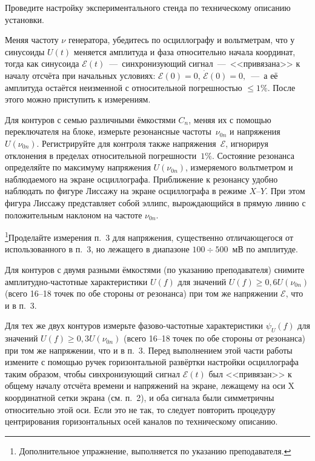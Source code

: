 \begin{lab:task}
    \item Проведите настройку экспериментального стенда по техническому описанию
установки.

    \item Меняя частоту $\nu$ генератора, убедитесь по осциллографу и вольтметрам,
что у синусоиды $U(t)$ меняется амплитуда и фаза относительно начала координат,
тогда как синусоида $\mathcal{E}(t)$~---~синхронизующий сигнал~---~<<привязана>>
к началу отсчёта при начальных условиях: $\mathcal{E}(0)=0$,
$\dot{\mathcal{E}}(0)=0,$~---~а её амплитуда остаётся неизменной с относительной
погрешностью  $\le1\%$. После этого можно приступить к измерениям.

    \item Для контуров с семью различными ёмкостями $C_n$, меняя их с помощью
переключателя на блоке, измерьте резонансные частоты~$\nu_{0n}$ и напряжения
$U(\nu_{0n})$. Регистрируйте для контроля также напряжения~$\mathcal{E}$,
игнорируя отклонения в пределах относительной погрешности~$1\%$. Состояние
резонанса определяйте по максимуму напряжения $U(\nu_{0n})$, измеряемого
вольтметром и наблюдаемого на экране осциллографа. Приближение к резонансу
удобно наблюдать по фигуре Лиссажу на экране осциллографа в режиме $X$--$Y$.
При этом фигура Лиссажу представляет собой эллипс, вырождающийся в прямую линию
с положительным наклоном  на частоте $\nu_{0n}$.

    \item \footnote{Дополнительное упражнение, выполняется по указанию
        преподавателя.}Проделайте измерения п.~3 для напряжения, существенно 
    отличающегося от использованного в п.~3, но лежащего в диапазоне $100\div500$~мВ 
    по амплитуде.

    \item Для контуров с двумя разными ёмкостями (по указанию преподавателя)
снимите амплитудно-частотные характеристики $U(f)$ для значений
$U(f)\ge0,6U(\nu_{0n})$ (всего 16--18 точек по обе стороны от резонанса) при
том же напряжении $\mathcal{E}$, что и в п.~3.

    \item Для тех же двух контуров измерьте фазово-частотные характеристики
$\psi_U(f)$ для значений $U(f)\ge0,3U(\nu_{0n})$ (всего 16--18 точек по обе
стороны от резонанса) при том же напряжении, что и в п.~3. Перед выполнением
этой части работы измените с помощью ручек горизонтальной развёртки настройки
осциллографа таким образом, чтобы синхронизующий сигнал $\mathcal{E}(t)$ был
<<привязан>> к общему началу отсчёта времени и напряжений на экране, лежащему на
оси X координатной сетки экрана (см. п.~2), и оба сигнала были симметричны
относительно этой оси. Если это не так, то следует повторить процедуру
центрирования горизонтальных осей каналов по техническому описанию.


\end{lab:task}
